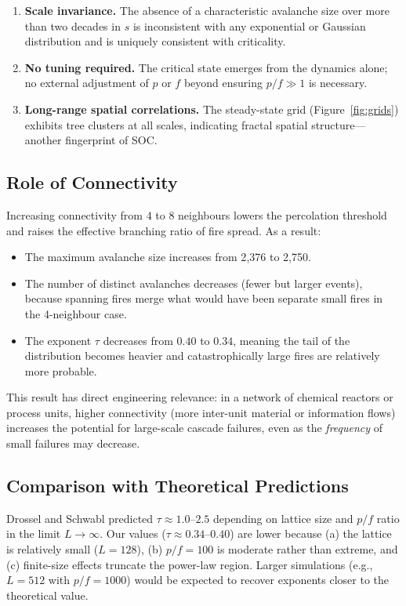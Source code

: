 \documentclass[12pt,a4paper]{article}
\begin{document}
\begin{enumerate}
  \item \textbf{Scale invariance.} The absence of a characteristic avalanche
        size over more than two decades in $s$ is inconsistent with any
        exponential or Gaussian distribution and is uniquely consistent with
        criticality.
  \item \textbf{No tuning required.} The critical state emerges from the
        dynamics alone; no external adjustment of $p$ or $f$ beyond ensuring
        $p/f \gg 1$ is necessary.
  \item \textbf{Long-range spatial correlations.} The steady-state grid
        (Figure~\ref{fig:grids}) exhibits tree clusters at all scales,
        indicating fractal spatial structure—another fingerprint of SOC.
\end{enumerate}

\subsection{Role of Connectivity}
Increasing connectivity from 4 to 8 neighbours lowers the percolation
threshold and raises the effective branching ratio of fire spread. As a
result:
\begin{itemize}
  \item The maximum avalanche size increases from 2{,}376 to 2{,}750.
  \item The number of distinct avalanches decreases (fewer but larger
        events), because spanning fires merge what would have been separate
        small fires in the 4-neighbour case.
  \item The exponent $\tau$ decreases from $0.40$ to $0.34$, meaning the
        tail of the distribution becomes heavier and catastrophically large
        fires are relatively more probable.
\end{itemize}
This result has direct engineering relevance: in a network of chemical
reactors or process units, higher connectivity (more inter-unit material
or information flows) increases the potential for large-scale cascade
failures, even as the \emph{frequency} of small failures may decrease.

\subsection{Comparison with Theoretical Predictions}
Drossel and Schwabl \cite{drossel1992} predicted $\tau \approx 1.0$--$2.5$
depending on lattice size and $p/f$ ratio in the limit $L\to\infty$.
Our values ($\tau \approx 0.34$--$0.40$) are lower because (a) the lattice
is relatively small ($L=128$), (b) $p/f = 100$ is moderate rather than
extreme, and (c) finite-size effects truncate the power-law region.
Larger simulations (e.g., $L = 512$ with $p/f = 1000$) would be expected
to recover exponents closer to the theoretical value.
\end{document}
